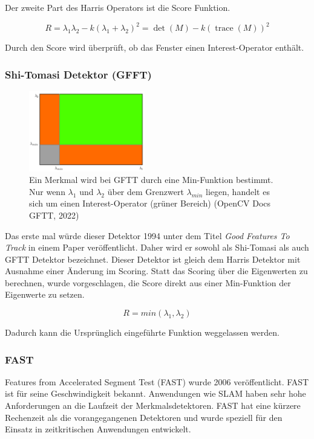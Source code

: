 Der zweite Part des Harris Operators ist die Score Funktion.

\begin{equation}
  R = \lambda_1 \lambda_2 - k(\lambda_1 + \lambda_2)^2 = \det(M) - k(\operatorname{trace}(M))^2
\end{equation}

Durch den Score wird überprüft, ob das Fenster einen Interest-Operator enthält. 

\subsubsection{Shi-Tomasi Detektor (GFFT)}
\begin{figure}[!ht]
  \centering
  \includegraphics[width=0.45\textwidth]{pictures/03_shitomasi_space.png}
  \caption[GFTT Detektor Merkmalsfindung]{Ein Merkmal wird bei GFTT durch eine Min-Funktion bestimmt. Nur wenn $\lambda_1$ und $\lambda_2$ über dem Grenzwert $\lambda_{min}$ liegen, handelt es sich um einen Interest-Operator (grüner Bereich) (OpenCV Docs GFTT, 2022)}
\end{figure}

Das erste mal würde dieser Detektor 1994 unter dem Titel \textit{Good Features To Track} in einem Paper veröffentlicht. Daher wird er sowohl als Shi-Tomasi als auch GFTT Detektor bezeichnet. Dieser Detektor ist gleich dem Harris Detektor mit Ausnahme einer Änderung im Scoring. Statt das Scoring über die Eigenwerten zu berechnen, wurde vorgeschlagen, die Score direkt aus einer Min-Funktion der Eigenwerte zu setzen. 

\begin{equation}
  R = min(\lambda_1,\lambda_2)
\end{equation}

Dadurch kann die Ursprünglich eingeführte Funktion weggelassen werden.

\subsubsection{FAST}
Features from Accelerated Segment Test (FAST) wurde 2006 veröffentlicht. FAST ist für seine Geschwindigkeit bekannt. Anwendungen wie SLAM haben sehr hohe Anforderungen an die Laufzeit der Merkmalsdetektoren. FAST hat eine kürzere Rechenzeit als die vorangegangenen Detektoren und wurde speziell für den Einsatz in zeitkritischen Anwendungen entwickelt.

